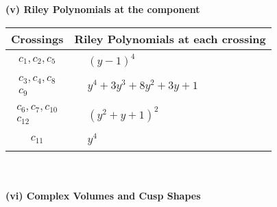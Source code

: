 \documentclass[1p]{elsarticle_modified}
\theoremstyle{definition}
\begin{document}
\newpage\renewcommand{\arraystretch}{1}
\flushleft \textbf{(v) Riley Polynomials at the component}\newline \\
\begin{tabular}{m{50pt}|m{274pt}}
Crossings & \hspace{64pt}Riley Polynomials at each crossing \\
\hline $$\begin{aligned}c_{1},c_{2},c_{5}\end{aligned}$$&$\begin{aligned}
&(y-1)^4
\end{aligned}$\\
\hline $$\begin{aligned}c_{3},c_{4},c_{8}\\c_{9}\end{aligned}$$&$\begin{aligned}
&y^4+3 y^3+8 y^2+3 y+1
\end{aligned}$\\
\hline $$\begin{aligned}c_{6},c_{7},c_{10}\\c_{12}\end{aligned}$$&$\begin{aligned}
&(y^2+y+1)^2
\end{aligned}$\\
\hline $$\begin{aligned}c_{11}\end{aligned}$$&$\begin{aligned}
&y^4
\end{aligned}$\\
\hline
\end{tabular}\\~\\
\newpage\flushleft \textbf{(vi) Complex Volumes and Cusp Shapes}
\end{document}
